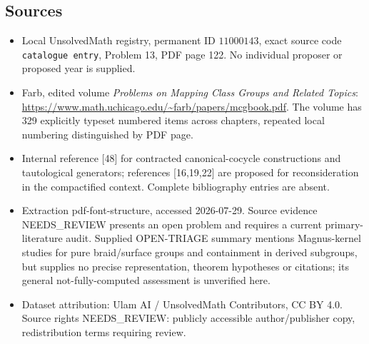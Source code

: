 \documentclass[11pt]{article}
\begin{document}
\subsection{Sources}
\begin{itemize}
\item Local UnsolvedMath registry, permanent ID \(11000143\), exact source code \texttt{catalogue entry}, Problem 13, PDF page 122. No individual proposer or proposed year is supplied.
\item Farb, edited volume \emph{Problems on Mapping Class Groups and Related Topics}: \url{https://www.math.uchicago.edu/~farb/papers/mcgbook.pdf}. The volume has 329 explicitly typeset numbered items across chapters, repeated local numbering distinguished by PDF page.
\item Internal reference [48] for contracted canonical-cocycle constructions and tautological generators; references [16,19,22] are proposed for reconsideration in the compactified context. Complete bibliography entries are absent.
\item Extraction pdf-font-structure, accessed 2026-07-29. Source evidence NEEDS\_REVIEW presents an open problem and requires a current primary-literature audit. Supplied OPEN-TRIAGE summary mentions Magnus-kernel studies for pure braid/surface groups and containment in derived subgroups, but supplies no precise representation, theorem hypotheses or citations; its general not-fully-computed assessment is unverified here.
\item Dataset attribution: Ulam AI / UnsolvedMath Contributors, CC BY 4.0. Source rights NEEDS\_REVIEW: publicly accessible author/publisher copy, redistribution terms requiring review.
\end{itemize}
\end{document}
